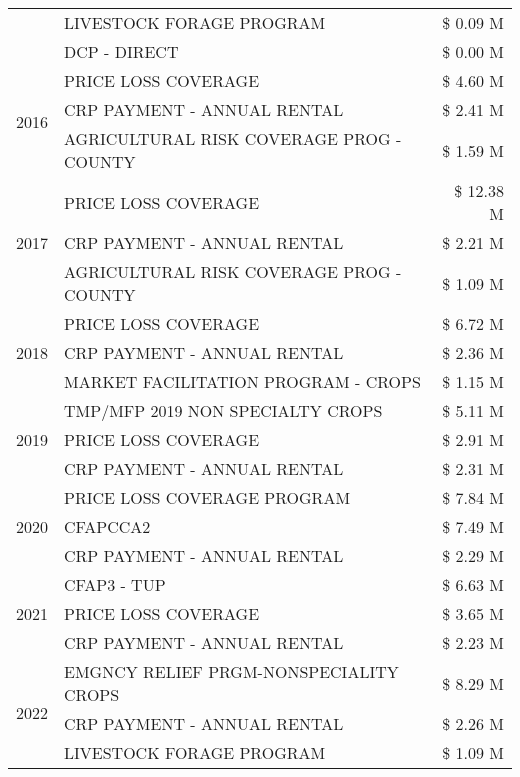 \begin{tabular}{llr}
 & LIVESTOCK FORAGE PROGRAM & \$ 0.09 M \\
 & DCP - DIRECT & \$ 0.00 M \\
\cline{1-3}
\multirow[t]{3}{*}{2016} & PRICE LOSS COVERAGE & \$ 4.60 M \\
 & CRP PAYMENT - ANNUAL RENTAL & \$ 2.41 M \\
 & AGRICULTURAL RISK COVERAGE PROG - COUNTY & \$ 1.59 M \\
\cline{1-3}
\multirow[t]{3}{*}{2017} & PRICE LOSS COVERAGE & \$ 12.38 M \\
 & CRP PAYMENT - ANNUAL RENTAL & \$ 2.21 M \\
 & AGRICULTURAL RISK COVERAGE PROG - COUNTY & \$ 1.09 M \\
\cline{1-3}
\multirow[t]{3}{*}{2018} & PRICE LOSS COVERAGE & \$ 6.72 M \\
 & CRP PAYMENT - ANNUAL RENTAL & \$ 2.36 M \\
 & MARKET FACILITATION PROGRAM - CROPS & \$ 1.15 M \\
\cline{1-3}
\multirow[t]{3}{*}{2019} & TMP/MFP 2019 NON SPECIALTY CROPS & \$ 5.11 M \\
 & PRICE LOSS COVERAGE & \$ 2.91 M \\
 & CRP PAYMENT - ANNUAL RENTAL & \$ 2.31 M \\
\cline{1-3}
\multirow[t]{3}{*}{2020} & PRICE LOSS COVERAGE PROGRAM & \$ 7.84 M \\
 & CFAPCCA2 & \$ 7.49 M \\
 & CRP PAYMENT - ANNUAL RENTAL & \$ 2.29 M \\
\cline{1-3}
\multirow[t]{3}{*}{2021} & CFAP3 - TUP & \$ 6.63 M \\
 & PRICE LOSS COVERAGE & \$ 3.65 M \\
 & CRP PAYMENT - ANNUAL RENTAL & \$ 2.23 M \\
\cline{1-3}
\multirow[t]{3}{*}{2022} & EMGNCY RELIEF PRGM-NONSPECIALITY CROPS & \$ 8.29 M \\
 & CRP PAYMENT - ANNUAL RENTAL & \$ 2.26 M \\
 & LIVESTOCK FORAGE PROGRAM & \$ 1.09 M \\
\cline{1-3}
\bottomrule
\end{tabular}

